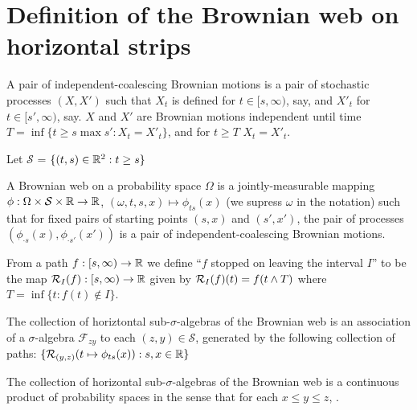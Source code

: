 {
\newcommand{\factor}[2]{\mathcal{F}_{#1 #2}}
\newcommand{\commafactor}[2]{\mathcal{F}_{#1,#2}}
\newcommand{\simplex}{\mathcal{S}}

\section{Definition of the Brownian web on horizontal strips}

\begin{definition}
  A pair of independent-coalescing Brownian motions is a pair of
  stochastic processes $(X, X')$ such that $X_t$ is defined for $t \in
  [s, \infty)$, say, and $X'_t$ for $t \in [s', \infty)$, say.  $X$
      and $X'$ are Brownian motions independent until time $T = \inf
      \{ t \ge s \max s' : X_t = X'_t\}$, and for $t \ge T$ $X_t =
      X'_t$.
\end{definition}

\begin{definition}
  Let $\simplex$ = $\{(t, s) \in \mathbb{R}^2 : t \ge s\}$
\end{definition}

\begin{definition}
  A Brownian web on a probability space $\Omega$ is a
  jointly-measurable mapping $\phi : \Omega \cross \simplex \cross
  \R \to \R$, $(\omega, t, s, x) \mapsto \phi_{ts}(x)$ (we supress
  $\omega$ in the notation) such that for fixed pairs of starting
  points $(s, x)$ and $(s', x')$, the pair of processes $(\phi_{\cdot
    s}(x), \phi_{\cdot s'}(x'))$ is a pair of independent-coalescing
  Brownian motions.
\end{definition}

\begin{definition}
  \label{def:restrict}
  From a path $f : [s, \infty) \to \mathbb{R}$ we define ``$f$ stopped on
    leaving the interval $I$'' to be the map $\mathcal{R}_{I}(f) : [s,
      \infty) \to \mathbb{R}$ given by $\mathcal{R}_{I}(f)(t) = f(t \wedge T)$
      where $T = \inf\{ t : f(t) \not\in I \}$.
\end{definition}

\begin{definition}
  The collection of horiztontal sub-$\sigma$-algebras of the Brownian web is an
  association of a $\sigma$-algebra $\factor{z}{y}$ to each $(z, y)
  \in \simplex$, generated by the following collection of paths:
  $\{ \mathcal{R}_{(y,z)}(t \mapsto \phi_{ts}(x)) : s, x \in \mathbb{R} \}$
\end{definition}

\begin{theorem}
  The collection of horizontal sub-$\sigma$-algebras of the Brownian
  web is a continuous product of probability spaces in the sense that
  for each $x \le y \le z$, \FIXME{$\factor{z}{y} \tensor \factor{y}{x} =
  \factor{z}{x}$}{Define this} .
\end{theorem}

}
